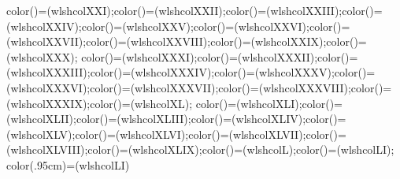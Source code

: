 {{color(\rXXI)=(wlshcolXXI);color(\rXXII)=(wlshcolXXII);color(\rXXIII)=(wlshcolXXIII);color(\rXXIV)=(wlshcolXXIV);color(\rXXV)=(wlshcolXXV);color(\rXXVI)=(wlshcolXXVI);color(\rXXVII)=(wlshcolXXVII);color(\rXXVIII)=(wlshcolXXVIII);color(\rXXIX)=(wlshcolXXIX);color(\rXXX)=(wlshcolXXX);%
color(\rXXXI)=(wlshcolXXXI);color(\rXXXII)=(wlshcolXXXII);color(\rXXXIII)=(wlshcolXXXIII);color(\rXXXIV)=(wlshcolXXXIV);color(\rXXXV)=(wlshcolXXXV);color(\rXXXVI)=(wlshcolXXXVI);color(\rXXXVII)=(wlshcolXXXVII);color(\rXXXVIII)=(wlshcolXXXVIII);color(\rXXXIX)=(wlshcolXXXIX);color(\rXL)=(wlshcolXL);%
color(\rXLI)=(wlshcolXLI);color(\rXLII)=(wlshcolXLII);color(\rXLIII)=(wlshcolXLIII);color(\rXLIV)=(wlshcolXLIV);color(\rXLV)=(wlshcolXLV);color(\rXLVI)=(wlshcolXLVI);color(\rXLVII)=(wlshcolXLVII);color(\rXLVIII)=(wlshcolXLVIII);color(\rXLIX)=(wlshcolXLIX);color(\rL)=(wlshcolL);color(\rLI)=(wlshcolLI);%
color(.95cm)=(wlshcolLI)%
}%
\ifx\pgfspectra@rainbowfade\@empty\relax%
%
\else%
%
\fi%
\else\PackageError{pgf-spectra}{invalid 'rainbow start' value (rainbow start=\pgfspectra@rainbow@start). The rainbow start should be greater or equal then 0 and lower then 1.}{Don't forget that 'rainbow start' value is the fraction from witch the  colors begin, relative to the center of a circle with radius 1...}%
\fi
}%
\makeatother%
\endinput
